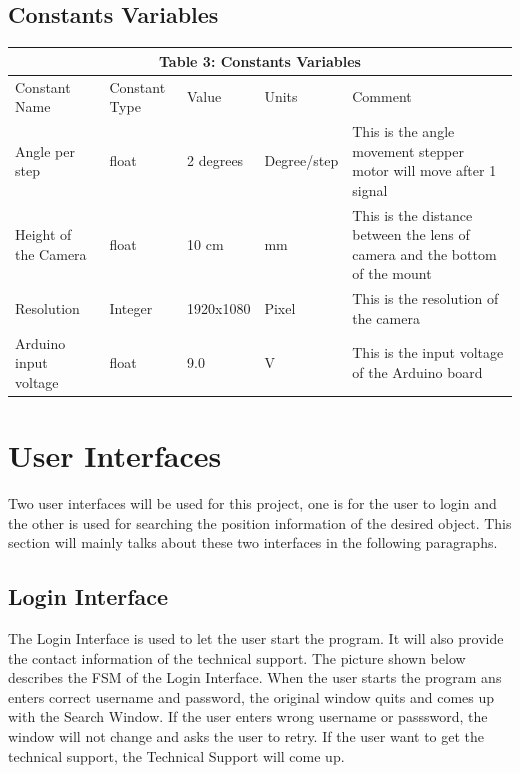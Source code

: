 \documentclass[12pt, titlepage]{article}
\begin{document}
\subsection{Constants Variables}
\begin{tabular}{|p{}|p{}|p{}|p{}|p{}|}

\hline \multicolumn{5}{|c|}{Table 3: Constants Variables}\\

\hline Constant Name&Constant Type&Value&Units &Comment\\

\hline Angle per step&float&2 degrees&Degree/step&This is the angle movement stepper motor will move after 1 signal \\

\hline Height of the Camera&float&10 cm&mm&This is the distance between the lens of camera and the bottom of the mount\\

\hline Resolution&Integer&1920x1080&Pixel&This is the resolution of the camera\\
\hline Arduino input voltage&float&9.0&V&This is the input voltage of the Arduino board\\


\hline

\end{tabular}




\section{User Interfaces}

Two user interfaces will be used for this project, one is for the user to login and the other is used for searching the position information of the desired object. This section will mainly talks about these two interfaces in the following paragraphs. 

\subsection{Login Interface}
The Login Interface is used to let the user start the program. It will also provide the contact information of the technical support. The picture shown below describes the FSM of the Login Interface. When the user starts the program ans enters correct username and password, the original window quits and comes up with the Search Window. If the user enters wrong username or passsword, the window will not change and asks the user to retry. If the user want to get the technical support, the Technical Support will come up. 
\end{document}
